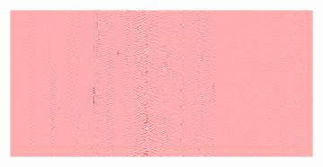 \begin{figure}[!h]
    \hfill
    \begin{subfigure}{0.33\textwidth}
        \includegraphics[width=\textwidth]{figures/anomalies/before/20190415_031755.png}
    \end{subfigure}
    
    \vspace{1em}
    

\end{figure}
